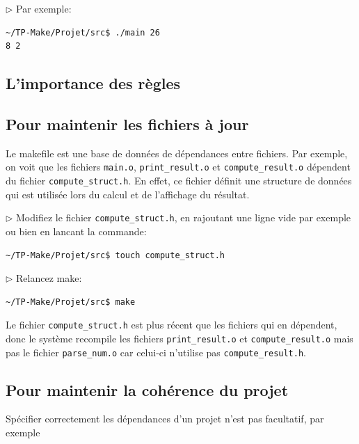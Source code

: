 \documentclass[11pt,a4paper]{article}
\newcommand{\must}{\noindent $\triangleright$ \xspace}
\begin{document}
\medskip

\must Par exemple:
{\small
\begin{verbatim}
~/TP-Make/Projet/src$ ./main 26
8 2
\end{verbatim}
}

\subsection{L'importance des règles}

\subsection{Pour maintenir les fichiers à jour}

Le makefile est une base de données de dépendances entre
fichiers. Par exemple, on voit que les fichiers \texttt{main.o},
\texttt{print\_result.o} et \texttt{compute\_re\-sult.o} dépendent du
fichier \texttt{compute\_struct.h}.  En effet, ce fichier définit une
structure de données qui est utilisée lors du calcul et de l'affichage
du résultat.

\medskip

\must Modifiez le fichier \verb!compute_struct.h!, en rajoutant une
ligne vide par exemple ou bien en lancant la commande:
{\small
\begin{verbatim}
~/TP-Make/Projet/src$ touch compute_struct.h
\end{verbatim}
}

\must Relancez make:
{\small
\begin{verbatim}
~/TP-Make/Projet/src$ make
\end{verbatim}
}

\noindent Le fichier \verb!compute_struct.h! est plus récent que les
fichiers qui en dépendent, donc le système recompile les fichiers
\verb!print_result.o! et \verb!compute_result.o! mais pas le fichier
\verb!parse_num.o! car celui-ci n'utilise pas \verb!compute_result.h!.

\subsection{Pour maintenir la cohérence du projet}

\noindent Spécifier correctement les dépendances d'un projet n'est pas
facultatif, par exemple

\medskip
\end{document}
